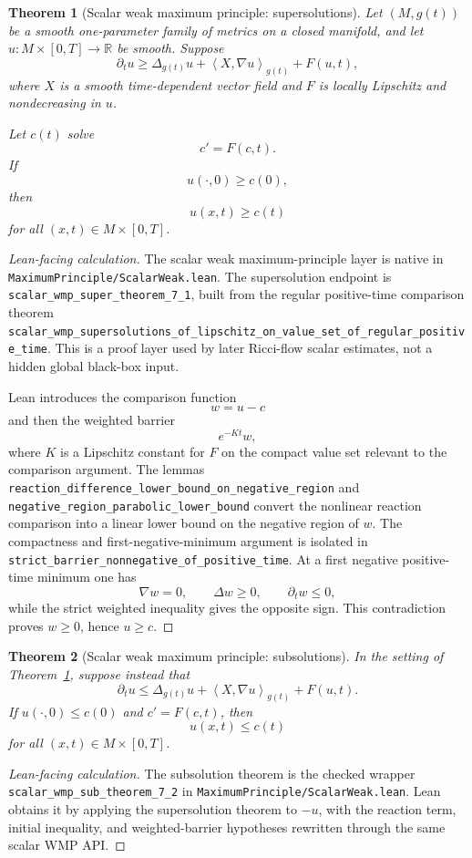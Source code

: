 \documentclass[11pt]{article}
\theoremstyle{plain}
\newtheorem{theorem}{Theorem}[section]
\theoremstyle{definition}
\theoremstyle{remark}
\newcommand{\ip}[2]{\left\langle #1,#2\right\rangle}
\newcommand{\leanref}[1]{\nolinkurl{#1}}
\newcommand{\leanfile}[1]{\nolinkurl{#1}}
\newcommand{\rffile}[1]{\leanfile{#1}}
\begin{document}
\begin{theorem}[Scalar weak maximum principle: supersolutions]
\label{thm:scalar-wmp-super}
Let $(M,g(t))$ be a smooth one-parameter family of metrics on a closed
manifold, and let $u:M\times[0,T]\to\mathbb R$ be smooth. Suppose
\[
\partial_tu
\ge
\Delta_{g(t)}u+
\ip{X}{\nabla u}_{g(t)}+F(u,t),
\]
where $X$ is a smooth time-dependent vector field and $F$ is locally Lipschitz
and nondecreasing in $u$.

Let $c(t)$ solve
\[
c'=F(c,t).
\]
If
\[
u(\cdot,0)\ge c(0),
\]
then
\[
u(x,t)\ge c(t)
\]
for all $(x,t)\in M\times[0,T]$.
\end{theorem}

\begin{proof}[Lean-facing calculation]
The scalar weak maximum-principle layer is native in
\rffile{MaximumPrinciple/ScalarWeak.lean}.  The supersolution endpoint is
\leanref{scalar_wmp_super_theorem_7_1}, built from the regular positive-time
comparison theorem
\leanref{scalar_wmp_supersolutions_of_lipschitz_on_value_set_of_regular_positive_time}.
This is a proof layer used by later Ricci-flow scalar estimates, not a hidden
global black-box input.

Lean introduces the comparison function
\[
  w=u-c
\]
and then the weighted barrier
\[
  e^{-Kt}w,
\]
where $K$ is a Lipschitz constant for $F$ on the compact value set relevant to
the comparison argument.  The lemmas
\leanref{reaction_difference_lower_bound_on_negative_region} and
\leanref{negative_region_parabolic_lower_bound} convert the nonlinear reaction
comparison into a linear lower bound on the negative region of $w$.  The
compactness and first-negative-minimum argument is isolated in
\leanref{strict_barrier_nonnegative_of_positive_time}.  At a first negative
positive-time minimum one has
\[
  \nabla w=0,
  \qquad
  \Delta w\ge0,
  \qquad
  \partial_tw\le0,
\]
while the strict weighted inequality gives the opposite sign.  This
contradiction proves $w\ge0$, hence $u\ge c$.
\end{proof}

\begin{theorem}[Scalar weak maximum principle: subsolutions]
\label{thm:scalar-wmp-sub}
In the setting of Theorem~\ref{thm:scalar-wmp-super}, suppose instead that
\[
\partial_tu
\le
\Delta_{g(t)}u+
\ip{X}{\nabla u}_{g(t)}+F(u,t).
\]
If $u(\cdot,0)\le c(0)$ and $c'=F(c,t)$, then
\[
u(x,t)\le c(t)
\]
for all $(x,t)\in M\times[0,T]$.
\end{theorem}

\begin{proof}[Lean-facing calculation]
The subsolution theorem is the checked wrapper
\leanref{scalar_wmp_sub_theorem_7_2} in
\rffile{MaximumPrinciple/ScalarWeak.lean}.  Lean obtains it by applying the
supersolution theorem to $-u$, with the reaction term, initial inequality, and
weighted-barrier hypotheses rewritten through the same scalar WMP API.
\end{proof}
\end{document}
